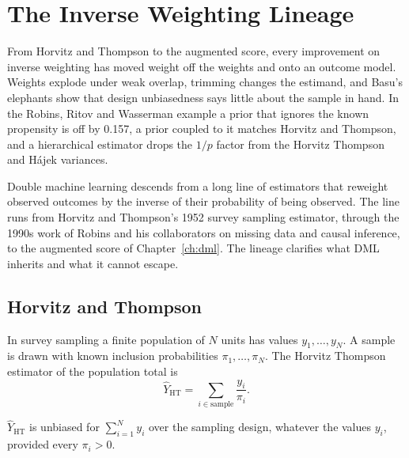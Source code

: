 \chapter{The Inverse Weighting Lineage}\label{ch:ipw}

\begin{tcolorbox}[colback=gray!6,colframe=gray!50,title=In brief,fonttitle=\normalfont\itshape,coltitle=black,colbacktitle=gray!15,boxrule=0.4pt,arc=1pt]
From Horvitz and Thompson to the augmented score, every improvement on inverse weighting has moved weight off the weights and onto an outcome model. Weights explode under weak overlap, trimming changes the estimand, and Basu's elephants show that design unbiasedness says little about the sample in hand. In the Robins, Ritov and Wasserman example a prior that ignores the known propensity is off by 0.157, a prior coupled to it matches Horvitz and Thompson, and a hierarchical estimator drops the $1/p$ factor from the Horvitz Thompson and H\'ajek variances.
\end{tcolorbox}

Double machine learning descends from a long line of estimators that reweight observed outcomes by the inverse of their probability of being observed. The line runs from Horvitz and Thompson's 1952 survey sampling estimator, through the 1990s work of Robins and his collaborators on missing data and causal inference, to the augmented score of Chapter~\ref{ch:dml}. The lineage clarifies what DML inherits and what it cannot escape.

\section{Horvitz and Thompson}

In survey sampling a finite population of $N$ units has values $y_1, \ldots, y_N$. A sample is drawn with known inclusion probabilities $\pi_1, \ldots, \pi_N$. The Horvitz Thompson estimator of the population total is
\[
\hat Y_{\mathrm{HT}} = \sum_{i \in \text{sample}} \frac{y_i}{\pi_i}.
\]

\begin{proposition}
$\hat Y_{\mathrm{HT}}$ is unbiased for $\sum_{i=1}^N y_i$ over the sampling design, whatever the values $y_i$, provided every $\pi_i > 0$.
\end{proposition}

